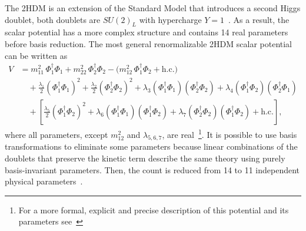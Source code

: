 \documentclass[a4paper, 11pt]{article}
\begin{document}
The 2HDM is an extension of the Standard Model that introduces a second Higgs doublet, both doublets are $SU(2)_L$ with hypercharge $Y=1$~\cite{2HDM}. As a result, the scalar potential has a more complex structure and contains 14 real parameters before basis reduction. The most general renormalizable 2HDM scalar potential can be written as
\begin{align*}
    V &= m_{11}^2\,\Phi_1^\dagger \Phi_1 + m_{22}^2\,\Phi_2^\dagger \Phi_2
    -\Big(m_{12}^2\,\Phi_1^\dagger \Phi_2 + \text{h.c.}\Big)
    \nonumber\\
    &\quad
    +\frac{\lambda_1}{2}(\Phi_1^\dagger \Phi_1)^2
    +\frac{\lambda_2}{2}(\Phi_2^\dagger \Phi_2)^2
    +\lambda_3(\Phi_1^\dagger \Phi_1)(\Phi_2^\dagger \Phi_2)
    +\lambda_4(\Phi_1^\dagger \Phi_2)(\Phi_2^\dagger \Phi_1)
    \nonumber\\
    &\quad
    +\left[
    \frac{\lambda_5}{2}(\Phi_1^\dagger \Phi_2)^2
    +\lambda_6(\Phi_1^\dagger \Phi_1)(\Phi_1^\dagger \Phi_2)
    +\lambda_7(\Phi_2^\dagger \Phi_2)(\Phi_1^\dagger \Phi_2)
    +\text{h.c.}
    \right],
    \label{eq:2DHM_potential}
\end{align*}
where all parameters, except $m_{12}^2$ and $\lambda_{5,6,7}$, are real~\cite{2HDM}\footnote{For a more formal, explicit and precise description of this potential and its parameters see~\cite{2HDM, bilinear_2HDM}}. It is possible to use basis transformations to eliminate some parameters because linear combinations of the doublets that preserve the kinetic term describe the same theory using purely basis-invariant parameters. Then, the count is reduced from 14 to 11 independent physical parameters~\cite{2HDM}.
\end{document}
